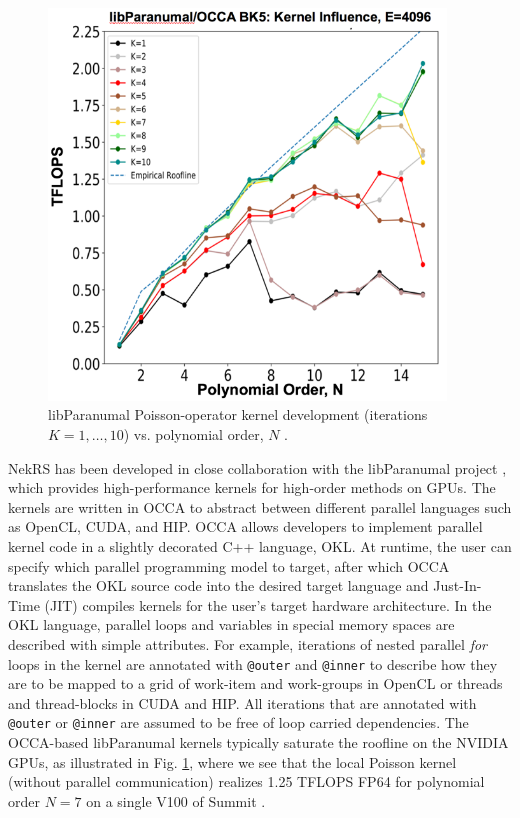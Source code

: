 \begin{figure}
\vspace{-0.8em}
\centering
\includegraphics[width=0.94\textwidth]{figs/libp_kernels.png}
\caption{\label{fig:roof}\small{
libParanumal Poisson-operator kernel development (iterations $K=1,\dots,10$)
vs.  polynomial order, $N$   \cite{ceed_bp_paper_2020}.}}
\vspace{-0.8em}
\end{figure}
NekRS has been developed in close collaboration with the libParanumal project
\cite{warburton2019,ChalmersKarakusAustinSwirydowiczWarburton2020,streamParanumal2020},
which provides high-performance kernels for high-order methods on GPUs.  The
kernels are written in OCCA to abstract between different parallel languages
such as OpenCL, CUDA, and HIP. OCCA allows developers to implement parallel
kernel code in a slightly decorated C++ language, OKL.  At runtime, the user
can specify which parallel programming model to target, after which OCCA
translates the OKL source code into the desired target language and
Just-In-Time (JIT) compiles kernels for the user's target hardware
architecture.  In the OKL language, parallel loops and variables in special
memory spaces are described with simple attributes. For example, iterations of
nested parallel {\em for} loops in the kernel are annotated with
\texttt{@outer} and \texttt{@inner} to describe how they are to be mapped to a
grid of work-item and work-groups in OpenCL or threads and thread-blocks in
CUDA and HIP. All iterations that are annotated with \texttt{@outer} or
\texttt{@inner} are assumed to be free of loop carried dependencies.
The OCCA-based libParanumal kernels
typically saturate the roofline on the NVIDIA GPUs, as illustrated
in Fig. \ref{fig:roof}, where we see that the local Poisson kernel
(without parallel communication) realizes 1.25 TFLOPS FP64 for polynomial
order $N=7$ on a single V100 of Summit \cite{ceed_bp_paper_2020}.





